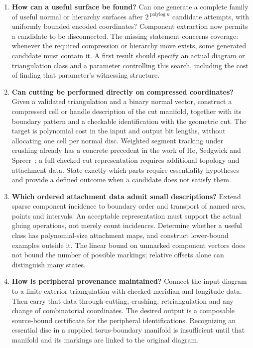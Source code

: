 \begin{enumerate}
\item \textbf{How can a useful surface be found?}
Can one generate a complete family of useful normal or hierarchy surfaces
after $2^{\operatorname{polylog} n}$ candidate attempts, with uniformly
bounded encoded coordinates? Component extraction now permits a candidate
to be disconnected. The missing statement concerns coverage: whenever
the required compression or hierarchy move exists, some generated
candidate must contain it. A first result should specify an actual
diagram or triangulation class and a parameter controlling this search,
including the cost of finding that parameter's witnessing structure.

\item \textbf{Can cutting be performed directly on compressed coordinates?}
Given a validated triangulation and a binary normal vector, construct a
compressed cell or handle description of the cut manifold, together with
its boundary pattern and a checkable identification with the geometric
cut. The target is polynomial cost in the input and output bit lengths,
without allocating one cell per normal disc. Weighted segment tracking
under crushing already has a concrete precedent in the work of
He, Sedgwick and Spreer~\cite[Section 4.1]{hesedgwickspreer2025}; a full
checked cut representation requires additional topology and attachment
data. State exactly which parts
require essentiality hypotheses and provide a defined outcome when a
candidate does not satisfy them.

\item \textbf{Which ordered attachment data admit small descriptions?}
Extend sparse component incidence to boundary order and transport of
named arcs, points and intervals. An acceptable representation must
support the actual gluing operations, not merely count incidences.
Determine whether a useful class has polynomial-size attachment maps,
and construct lower-bound examples outside it. The linear bound on
unmarked component vectors does not bound the number of possible
markings; relative offsets alone can distinguish many states.

\item \textbf{How is peripheral provenance maintained?}
Connect the input diagram to a finite exterior triangulation with checked
meridian and longitude data. Then carry that data through cutting,
crushing, retriangulation and any change of combinatorial coordinates.
The desired output is a composable source-bound certificate for the
peripheral identifications. Recognizing an essential disc in a supplied
torus-boundary manifold is insufficient until that manifold and its
markings are linked to the original diagram.


\end{enumerate}
